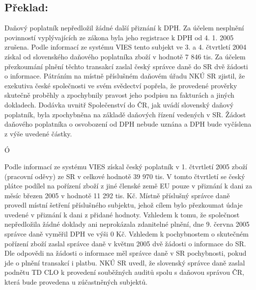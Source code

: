 \documentclass[10pt]{article}
\begin{document}
\subsection*{Překlad:}

Daňový poplatník nepředložil žádné další přiznání k DPH.
Za účelem nesplnění povinností vyplývajících ze zákona byla jeho registrace k DPH od 4. 1. 2005 zrušena.
Podle informací ze systému VIES tento subjekt ve 3. a 4. čtvrtletí 2004 získal od slovenského daňového poplatníka zboží v hodnotě 7 846 tis.
Za účelem přezkoumání plnění těchto transakcí zaslal český správce daně do SR dvě žádosti o informace.
Pátráním na místně příslušném daňovém úřadu NKÚ SR zjistil, že exekutiva české společnosti ve svém svědectví popřela, že provedené prověrky skutečně proběhly a zpochybnily pravost jeho podpisu na fakturách a jiných dokladech.
Dodávka uvnitř Společenství do ČR, jak uvádí slovenský daňový poplatník, byla zpochybněna na základě daňových řízení vedených v SR.
Žádost daňového poplatníka o osvobození od DPH nebude uznána a DPH bude vyčíslena z výše uvedené částky.


Ó

Podle informací ze systému VIES získal český poplatník v 1. čtvrtletí 2005 zboží (pracovní oděvy) ze SR v celkové hodnotě 39 970 tis.
V tomto čtvrtletí se český plátce podílel na pořízení zboží z jiné členské země EU pouze v přiznání k dani za měsíc březen 2005 v hodnotě 11 292 tis. Kč.
Místně příslušný správce daně provedl místní šetření příslušného subjektu, jehož cílem bylo přezkoumat údaje uvedené v přiznání k dani z přidané hodnoty.
Vzhledem k tomu, že společnost nepředložila žádné doklady ani neprokázala zdanitelné plnění, dne 9. června 2005 správce daně vyměřil DPH ve výši 0 Kč.
Vzhledem k pochybnostem o skutečném pořízení zboží zaslal správce daně v květnu 2005 dvě žádosti o informace do SR.
Dle odpovědi na žádosti o informace měl správce daně v SR pochybnosti, pokud jde o plnění transakcí i platbu.
NKÚ SR uvedl, že slovenský správce daně zaslal podnětu TD CLO k provedení souběžných auditů spolu s daňovou správou ČR, která bude provedena u zúčastněných subjektů.
\end{document}

